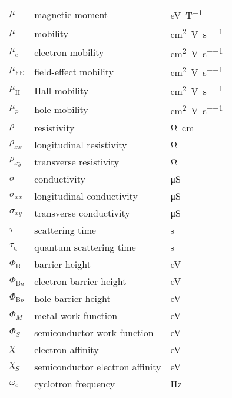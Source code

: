 \begin{longtable}[l]{p{125pt} p{150pt} p{150pt}}
	$\mu$ & magnetic moment & \si{\electronvolt\per\tesla}\\
	$\mu$ & mobility & \si{\cm\squared\per\volt\per\second}\\
	$\mu_e$ & electron mobility & \si{\cm\squared\per\volt\per\second}\\
	$\mu_\mathrm{FE}$ & field-effect mobility & \si{\cm\squared\per\volt\per\second}\\
	$\mu_\mathrm{H}$ & Hall mobility & \si{\cm\squared\per\volt\per\second}\\
	$\mu_p$ & hole mobility & \si{\cm\squared\per\volt\per\second}\\
	$\rho$ & resistivity & \si{\ohm\cm}\\
	$\rho_{xx}$ & longitudinal resistivity & \si{\ohm}\\
	$\rho_{xy}$ & transverse resistivity & \si{\ohm}\\
	$\sigma$ & conductivity & \si{\micro\siemens} \\
	$\sigma_{xx}$ & longitudinal conductivity & \si{\micro\siemens}\\
	$\sigma_{xy}$ & transverse conductivity & \si{\micro\siemens}\\
	$\tau$ & scattering time & \si{\second}\\
	$\tau_\mathrm{q}$ & quantum scattering time & \si{\second}\\
	$\Phi_\mathrm{B}$ & barrier height & \si{\electronvolt}\\
	$\Phi_{\mathrm{B}n}$ & electron barrier height & \si{\electronvolt}\\
	$\Phi_{\mathrm{B}p}$ & hole barrier height & \si{\electronvolt}\\
	$\Phi_M$ & metal work function & \si{\electronvolt}\\
	$\Phi_S$ & semiconductor work function & \si{\electronvolt}\\
	$\chi$ & electron affinity & \si{\electronvolt}\\
	$\chi_S$ & semiconductor electron affinity & \si{\electronvolt}\\
	$\omega_{c}$ & cyclotron frequency & \si{\hertz}\\
\bottomrule
\end{longtable}


%
